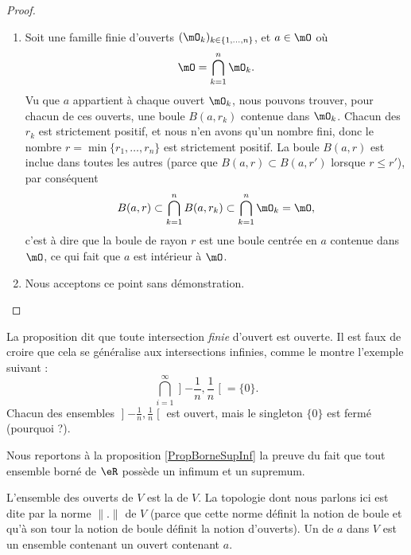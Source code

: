 \begin{proof}
\begin{enumerate}
		\item
			Soit une famille finie d'ouverts $(\mO_k)_{k\in\{ 1,\ldots,n \}}$, et $a\in\mO$ où
			\begin{equation}
				\mO=\bigcap_{k=1}^n\mO_k.
			\end{equation}
			Vu que $a$ appartient à chaque ouvert $\mO_k$, nous pouvons trouver, pour chacun de ces ouverts, une boule $B(a,r_k)$ contenue dans $\mO_k$. Chacun des $r_k$ est strictement positif, et nous n'en avons qu'un nombre fini, donc le nombre $r=\min\{ r_1,\ldots,r_n \}$ est strictement positif. La boule $B(a,r)$ est inclue dans toutes les autres (parce que $B(a,r)\subset B(a,r')$ lorsque $r\leq r'$), par conséquent
			\begin{equation}
				B(a,r)\subset\bigcap_{k=1}^nB(a,r_k)\subset\bigcap_{k=1}^n\mO_k=\mO,
			\end{equation}
			c'est à dire que la boule de rayon $r$ est une boule centrée en $a$ contenue dans $\mO$, ce qui fait que $a$ est intérieur à $\mO$.
		\item
			Nous acceptons ce point sans démonstration. 
	\end{enumerate}
	
\end{proof}

La proposition dit que toute intersection \emph{finie} d'ouvert est ouverte. Il est faux de croire que cela se généralise aux intersections infinies, comme le montre l'exemple suivant :
\begin{equation}
	\bigcap_{i=1}^{\infty}\mathopen] -\frac{1}{ n } , \frac{1}{ n } \mathclose[=\{ 0 \}.
\end{equation}
Chacun des ensembles $\mathopen] -\frac{1}{ n } , \frac{1}{ n } \mathclose[$ est ouvert, mais le singleton $\{ 0 \}$ est fermé (pourquoi ?).

Nous reportons à la proposition \ref{PropBorneSupInf} la preuve du fait que tout ensemble borné de $\eR$ possède un infimum et un supremum.



\begin{definition}
	L'ensemble des ouverts de $V$ est la  de $V$. La topologie dont nous parlons ici est dite  par la norme $\| . \|$ de $V$ (parce que cette norme définit la notion de boule et qu'à son tour la notion de boule définit la notion d'ouverts). Un  de $a$ dans $V$ est un ensemble contenant un ouvert contenant $a$.
\end{definition}

